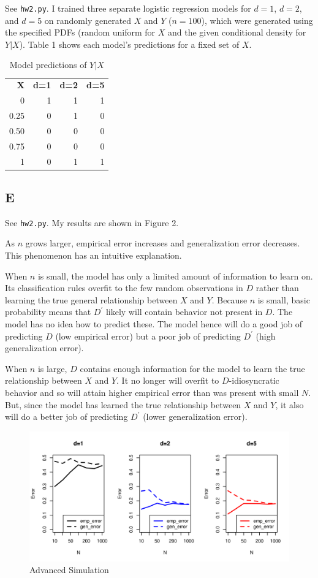 \documentclass{report}
\begin{document}
See \texttt{hw2.py}. I trained three separate logistic regression models for $d=1$, $d=2$, 
and $d=5$ on randomly generated $X$ and $Y$ ($n=100$), which were generated using the specified
PDFs (random uniform for $X$ and the given conditional density for $Y|X$). 
Table 1 shows each model's predictions for a fixed set of $X$.
\begin{table}[h]
	\centering
	\caption{Model predictions of $Y|X$}
	\begin{tabular}{|r r r r|}
		\hline
		\textbf{X} & \textbf{d=1} & \textbf{d=2} & \textbf{d=5} \\
		0    & 1 & 1 & 1 \\
		0.25 & 0 & 1 & 0 \\
		0.50 & 0 & 0 & 0 \\
		0.75 & 0 & 0 & 0 \\
		1    & 0 & 1 & 1 \\
		\hline
	\end{tabular}
\end{table}

\newpage

\subsection*{E}
See \texttt{hw2.py}. My results are shown in Figure 2. 

As $n$ grows larger, empirical error increases and generalization error decreases. 
This phenomenon has an intuitive explanation. 

When $n$ is small, the model has only a limited amount of information to learn
on. Its classification rules overfit to the few random observations in $D$ rather than
learning the true general relationship between $X$ and $Y$. Because $n$ is small, basic
probability means that $D^\prime$ likely will contain behavior not present in
$D$. The model has no idea how to predict these. The
model hence will do a good job of predicting $D$ (low empirical error) but a
poor job of predicting $D^\prime$
(high generalization error). 

When $n$ is large, $D$ contains enough information for the model to learn the
true relationship between $X$ and $Y$. It no longer will overfit to $D$-idiosyncratic
behavior and so will attain higher empirical error than was present with small
$N$. But, since the model has learned the true relationship between $X$ and $Y$,
it also will do a better job of predicting $D^\prime$ (lower generalization error).

\begin{figure}[h]
	\caption{Advanced Simulation}
	\centering
	\includegraphics[scale=1]{plot}
\end{figure}
\end{document}
